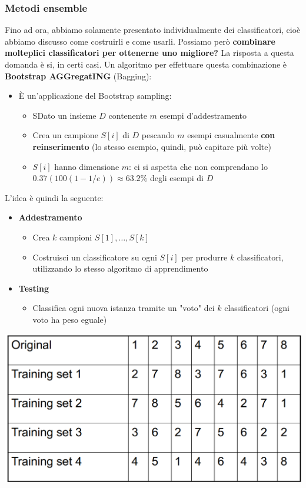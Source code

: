 \documentclass[12pt]{article}
\begin{document}
\subsubsection{Metodi ensemble}
Fino ad ora, abbiamo solamente presentato individualmente dei classificatori, cioè abbiamo discusso come costruirli e come usarli.
Possiamo però \textbf{combinare molteplici classificatori per ottenerne uno migliore?}
La risposta a questa domanda è si, in certi casi.
Un algoritmo per effettuare questa combinazione è \textbf{Bootstrap AGGregatING} (Bagging):
\begin{itemize}
    \item È un'applicazione del Bootstrap sampling:
    \begin{itemize}
        \item SDato un insieme $D$ contenente $m$ esempi d'addestramento
        \item Crea un campione $S[i]$ di $D$ pescando $m$ esempi casualmente \textbf{con reinserimento} (lo stesso esempio, quindi, può capitare più volte)
        \item $S[i]$ hanno dimensione $m$: ci si aspetta che non comprendano lo $0.37 (100(1-1/e)) \approx 63.2\%$ degli esempi di $D$
    \end{itemize}
\end{itemize}
L'idea è quindi la seguente:
\begin{itemize}
    \item \textbf{Addestramento}
    \begin{itemize}
        \item Crea $k$ campioni $S[1], \dots, S[k]$
        \item Costruisci un classificatore su ogni $S[i]$ per produrre $k$ classificatori, utilizzando lo stesso algoritmo di apprendimento 
    \end{itemize}
    \item \textbf{Testing}
    \begin{itemize}
        \item Classifica ogni nuova istanza tramite un "voto" dei $k$ classificatori (ogni voto ha peso eguale)
    \end{itemize}
\end{itemize}
\begin{center}
    \includegraphics[width =0.80\linewidth]{Images/84.PNG}
\end{center}
\end{document}

